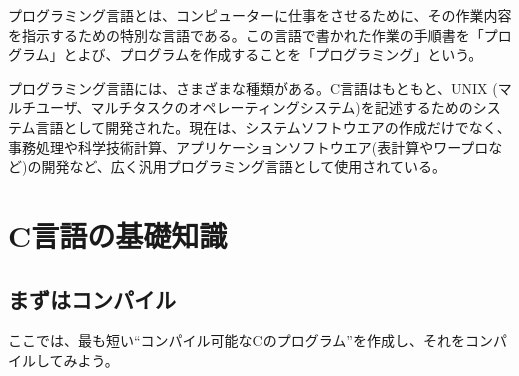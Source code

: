 プログラミング言語とは、コンピューターに仕事をさせるために、その作業内容を指示するための特別な言語である。この言語で書かれた作業の手順書を「プログラム」とよび、プログラムを作成することを「プログラミング」という。

プログラミング言語には、さまざまな種類がある。C言語はもともと、UNIX (マルチユーザ、マルチタスクのオペレーティングシステム)を記述するためのシステム言語として開発された。現在は、システムソフトウエアの作成だけでなく、事務処理や科学技術計算、アプリケーションソフトウエア(表計算やワープロなど)の開発など、広く汎用プログラミング言語として使用されている。

\section{C言語の基礎知識}
\label{sec:C:basic}
\subsection{まずはコンパイル}

ここでは、最も短い``コンパイル可能なCのプログラム''を作成し、それをコンパイルしてみよう。

